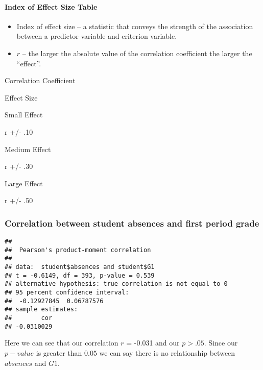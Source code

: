 \documentclass[
]{book}
\newenvironment{Shaded}{\begin{snugshade}}{\end{snugshade}}
\newcommand{\FunctionTok}[1]{\textcolor[rgb]{0.13,0.29,0.53}{\textbf{#1}}}
\newcommand{\NormalTok}[1]{#1}
\newcommand{\SpecialCharTok}[1]{\textcolor[rgb]{0.81,0.36,0.00}{\textbf{#1}}}
\providecommand{\tightlist}{%
  \setlength{\itemsep}{0pt}\setlength{\parskip}{0pt}}
\theoremstyle{definition}
\theoremstyle{definition}
\theoremstyle{definition}
\theoremstyle{definition}
\theoremstyle{remark}
\begin{document}
\hypertarget{index-of-effect-size-table}{%
\paragraph{Index of Effect Size Table}\label{index-of-effect-size-table}}

\begin{itemize}
\tightlist
\item
  Index of effect size -- a statistic that conveys the strength of the association between a predictor variable and criterion variable.
\item
  \(r\) -- the larger the absolute value of the correlation coefficient the larger the ``effect''.
\end{itemize}

Correlation Coefficient

Effect Size

Small Effect

r +/- .10

Medium Effect

r +/- .30

Large Effect

r +/- .50

\hypertarget{correlation-between-student-absences-and-first-period-grade}{%
\subsubsection{Correlation between student absences and first period grade}\label{correlation-between-student-absences-and-first-period-grade}}

\begin{Shaded}
\end{Shaded}

\begin{verbatim}
## 
##  Pearson's product-moment correlation
## 
## data:  student$absences and student$G1
## t = -0.6149, df = 393, p-value = 0.539
## alternative hypothesis: true correlation is not equal to 0
## 95 percent confidence interval:
##  -0.12927845  0.06787576
## sample estimates:
##        cor 
## -0.0310029
\end{verbatim}

Here we can see that our correlation \(r\) = -0.031 and our \(p>.05\). Since our \(p-value\) is greater than \(0.05\) we can say there is no relationship between \(absences\) and \(G1\).
\end{document}
